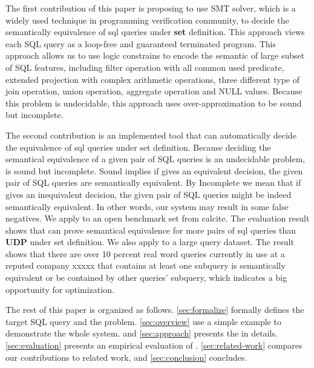 The first contribution of this paper is proposing to use SMT solver, which is a
widely used technique in programming verification community, to decide the
semantically equivalence of sql queries under \textbf{set} definition.
This approach views each SQL query as a loop-free and guaranteed terminated
program.
This approach allows us to use logic constrains to encode the semantic of large
subset of SQL features, including filter operation with all common used
predicate, extended projection with complex arithmetic operations, three
different type of join operation, union operation, aggregate operation and NULL
values.
Because this problem is undecidable, this approach uses over-approximation to be
sound but incomplete.

The second contribution is an implemented tool \sys that can automatically
decide the equivalence of sql queries under set definition.
Because deciding the semantical equivalence of a given pair of SQL queries is an
undecidable problem, \sys is sound but incomplete.
Sound implies if \sys gives an equivalent decision, the given pair of SQL
queries are semantically equivalent.
By Incomplete we mean that if \sys gives an inequivalent decision, the given
pair of SQL queries might be indeed semantically equivalent. In other words, our
system \sys may result in some false negatives.
We apply \sys to an open benchmark set from calcite.
The evaluation result shows that \sys can prove semantical equivalence for more
pairs of sql queries than \textbf{UDP} under set definition.
We also apply \sys to a large query dataset.
The result shows that there are over 10 percent real word queries currently in
use at a reputed company xxxxx that contains at least one subquery is
semantically equivalent or be contained by other queries' subquery, which
indicates a big opportunity for optimization.

The rest of this paper is organized as follows.
\autoref{sec:formalize} formally defines the target SQL query and the problem.
\autoref{sec:overview} use a simple example to demonstrate the whole system.
and \autoref{sec:approach} presents the \sys in details.
\autoref{sec:evaluation} presents an empirical evaluation of \sys.
\autoref{sec:related-work} compares our contributions to related work, and
\autoref{sec:conclusion} concludes.

